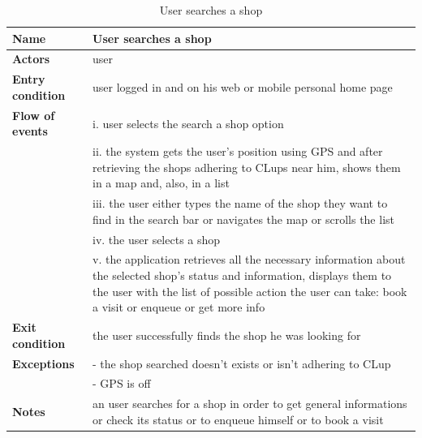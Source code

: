 \begin{table}[h!]
    \centering
    \begin{tabular}{@{}P{0.2\textwidth}P{0.70\textwidth}@{}}
        \toprule
        \textbf{Name}                 & User searches a shop\\
        \midrule
        \textbf{Actors}               & user\\
        \textbf{Entry condition}      & user logged in and on his web or mobile personal home page\\
        \textbf{Flow of events}            
        & i. user selects the search a shop option\\
        & ii. the system gets the user's position using GPS and after retrieving the shops adhering to CLups near him, shows them in a map and, also, in a list\\
        & iii. the user either types the name of the shop they want to find in the search bar or navigates the map or scrolls the list\\
        & iv. the user selects a shop\\
        & v. the application retrieves all the necessary information about the selected shop's status and information, displays them to the user with the list of possible action the user can take: book a visit or enqueue or get more info\\
        \textbf{Exit condition}       & the user successfully finds the shop he was looking for\\
        \textbf{Exceptions}           
        & - the shop searched doesn't exists or isn't adhering to CLup\\
        & - GPS is off\\
        \textbf{Notes} & an user searches for a shop in order to get general informations or check its status or to enqueue himself or to book a visit\\
        \bottomrule
    \end{tabular}
\caption{User searches a shop}
\label{table:usersearchesshop}
\end{table}

